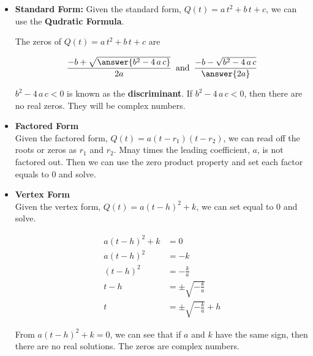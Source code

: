 \documentclass{ximera}
\begin{document}
\begin{itemize}

\item \textbf{Standard Form:}  Given the standard form, $Q(t) = a \, t^2 + b \, t + c$, we can use the \textbf{Qudratic Formula}.

The zeros of $Q(t) = a \, t^2 + b \, t + c$ are

\[   \frac{-b + \sqrt{\answer{b^2 - 4 \, a \, c}}}{2a}     \, \text{ and } \,       \frac{-b - \sqrt{b^2 - 4 \, a \, c}}{\answer{2a}}    \]



$b^2 - 4 \, a \, c < 0$ is known as the \textbf{discriminant}. If $b^2 - 4 \, a \, c < 0$, then there are no real zeros.  They will be complex numbers.


\item \textbf{\textcolor{red!10!blue!90!}{Factored Form}} \\ 
Given the factored form, $Q(t) = a (t - r_1)(t - r_2)$, we can read off the roots or zeros as $r_1$ and $r_2$. Mnay times the leading coefficient, $a$, is not factored out.  Then we can use the zero product property and set each factor equals to $0$ and solve.






\item  \textbf{\textcolor{red!10!blue!90!}{Vertex Form}} \\
Given the vertex form, $Q(t) = a (t - h)^2 + k$, we can set equal to $0$ and solve.



\begin{align*}
a (t - h)^2 + k    & = 0  \\
a (t - h)^2        & = -k  \\
(t - h)^2        & = -\frac{k}{a}  \\
t - h        & = \pm \sqrt{-\frac{k}{a}}  \\
t        & = \pm \sqrt{-\frac{k}{a}}  + h
\end{align*}

From $a (t - h)^2 + k  = 0$, we can see that if $a$ and $k$ have the same sign, then there are no real solutions.  The zeros are complex numbers.



\end{itemize}
\end{document}
